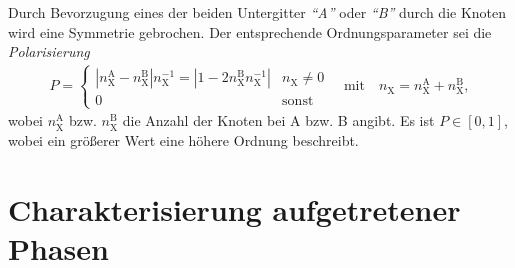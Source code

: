 \documentclass[a4paper, 10pt, twoside, openany]{book} %
\newcommand \abs[1]{\left | #1 \right |}
\def \nX {n_\mathrm{X}}
\begin{document}
	Durch Bevorzugung eines der beiden Untergitter \emph{"`A"'} oder \emph{"`B"'} durch die Knoten wird eine Symmetrie gebrochen. Der entsprechende Ordnungsparameter sei die \emph{Polarisierung}
	\begin{align*}
		P = \begin{cases} \abs{\nX^\text{A} - \nX^\text{B}} \nX^{-1} = \abs{1 - 2 \nX^\text{B} \nX^{-1}} & \nX \neq 0 \\ 0 & \text{sonst} \end{cases} \quad \text{mit} \quad \nX = \nX^\text{A} + \nX^\text{B},
	\end{align*}
	wobei $\nX^\text{A}$ bzw. $\nX^\text{B}$ die Anzahl der Knoten bei A bzw. B angibt. Es ist $P \in [0, 1]$, wobei ein größerer Wert eine höhere Ordnung beschreibt.
	
	\section{Charakterisierung aufgetretener Phasen}
	\label{Charakterisierung aufgetretener Phasen}
	
\end{document}
